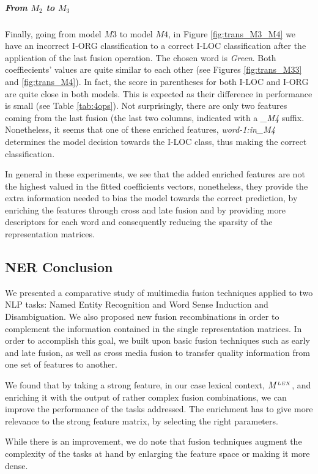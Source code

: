 \subparagraph{From $M_2$ to $M_3$} Finally, going from model $M3 $ to model $M4$, in Figure \ref{fig:trans_M3_M4} we have an incorrect I-ORG classification to a correct I-LOC classification after the application of the last fusion operation. The chosen word is \textit{Green}. Both coeffiecients' values are quite similar  to each other (see Figures \ref{fig:trans_M33} and \ref{fig:trans_M4}). In fact, the score in parentheses for both I-LOC and I-ORG are quite close in both models. This is expected as their difference in performance is small (see Table \ref{tab:4ops}). Not surprisingly, there are only two features coming from the last fusion (the last two columns, indicated with a \textit{\_M4} suffix. Nonetheless, it seems that one of these enriched features, \textit{word-1:in\_M4} determines the model decision towards the I-LOC class, thus making the correct classification.

In general in these experiments, we see that the added enriched features are not the highest valued in the fitted coefficients vectors, nonetheless, they  provide the extra information needed to bias the model towards the correct prediction, by enriching the features through cross and late fusion and by providing more descriptors for each word and consequently reducing the sparsity of the representation matrices.

\subsection{NER Conclusion}
\label{chap6:conclusion}
We presented  a comparative study of multimedia fusion techniques applied to two NLP tasks: Named Entity Recognition and Word Sense Induction and Disambiguation. We also proposed new fusion recombinations in order to complement the information contained in the single representation matrices. In order to accomplish this goal, we built upon basic fusion techniques such as early and late fusion, as well as cross media fusion to transfer quality information from one set of features to another. 

We found that by taking a strong feature, in our case lexical context, $M^{\scriptscriptstyle LEX}$, and enriching it with the output of rather complex fusion combinations, we can improve the performance of the tasks addressed. The enrichment has to give more relevance to the strong feature matrix, by selecting the right parameters. 

While there is an improvement, we do note that fusion techniques augment the complexity of the tasks at hand by enlarging the feature space or making it more dense.

